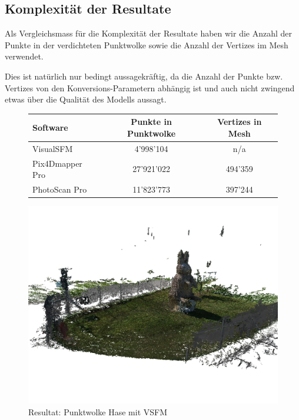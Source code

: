 \subsection{Komplexität der Resultate}

Als Vergleichsmass für die Komplexität der Resultate haben wir die Anzahl der
Punkte in der verdichteten Punktwolke sowie die Anzahl der Vertizes im Mesh
verwendet.

Dies ist natürlich nur bedingt aussagekräftig, da die Anzahl der Punkte bzw.
Vertizes von den Konversions-Parametern abhängig ist und auch nicht zwingend
etwas über die Qualität des Modells aussagt.

\begin{figure}[H]
	\begin{tabularx}{\textwidth}[H]{Xcc}
		\toprule
		\textbf{Software} & \textbf{Punkte in Punktwolke} & \textbf{Vertizes in Mesh} \\
		\midrule
		VisualSFM & 4'998'104 & n/a \\
		Pix4Dmapper Pro & 27'921'022 & 494'359 \\
		PhotoScan Pro & 11'823'773 & 397'244 \\
		\bottomrule
	\end{tabularx}
\end{figure}


\begin{figure}[p]
	\centerline{
		\includegraphics[width=20cm,angle=90]{images/rabbit-dense-vsfm.png}
	}
	\caption{Resultat: Punktwolke Hase mit VSFM}
	\label{img:rabbit-dense-vsfm}
\end{figure}

